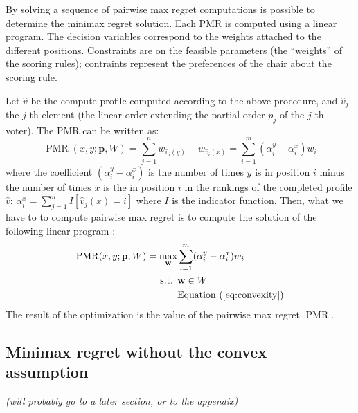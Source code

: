 \documentclass[12pt]{article}
\newcommand{\pprofile}{\textbf{p}}%
\newcommand{\w}{\textbf{w}}%
\DeclareMathOperator{\PMR}{PMR}
\begin{document}
By solving a sequence of pairwise max regret computations is possible to determine the minimax regret solution.
Each PMR is computed using a linear program.
The decision variables correspond to the weights attached to the different positions.
Constraints are on the feasible parameters (the ``weights'' of the scoring rules); contraints represent the preferences of the chair about the scoring rule.

Let $\hat{v}$ be the compute profile computed according to the above procedure, and  $\hat{v}_j$ the $j$-th element (the linear order extending the partial order $p_j$ of the $j$-th voter).
The PMR can be written as:
\[ \PMR(x,y; \pprofile, W) = \sum_{j=1}^n w_{\hat{v}_i(y)} - w_{\hat{v}_i(x)} 
= \sum_{i=1}^m (\alpha_{i}^{y} - \alpha_{i}^{x}) w_i \]
where the coefficient $ (\alpha_{i}^{y} - \alpha_{i}^{x})$ is the number of times $y$ is in position $i$ minus the number of times $x$ is the in position $i$ in the rankings of the completed profile $\hat{v}$:
$\alpha_{i}^{x} = \sum_{j=1}^{n}  I[\hat{v}_{j}(x)=i]$ where $I$ is the indicator function.
Then, what we have to to compute pairwise max regret is to compute the solution of the following linear program :
\begin{align*}
\PMR(x,y; \pprofile,W) = \max_{\w} & \sum_{i=1}^m (\alpha_{i}^{y} - \alpha_{i}^{x}) w_{i}\\
\text{ s.t. } & \w \in W \\
& \text{Equation } (\ref{eq:convexity})
\end{align*}
The result of the optimization is the value of the pairwise max regret $\PMR$.

\subsection{Minimax regret without the convex assumption}
{\em (will probably go to a later section, or to the appendix) }
\end{document}
